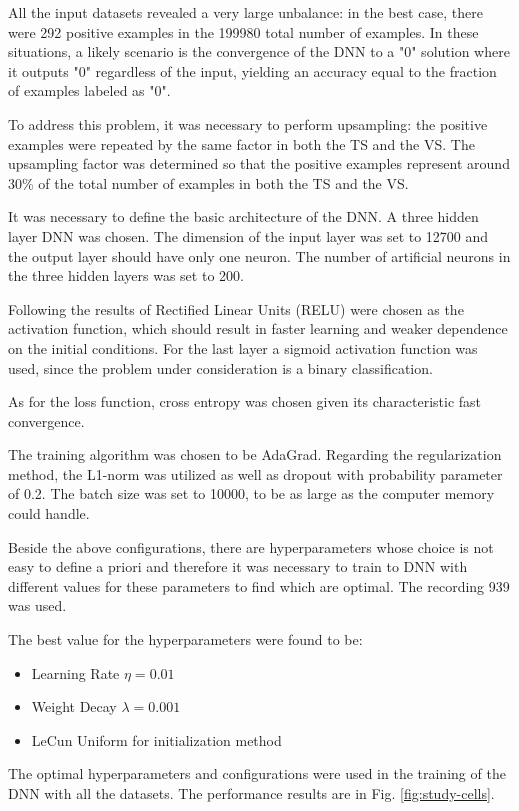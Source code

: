 \documentclass[10pt]{article}
\begin{document}
All the input datasets revealed a very large unbalance: in the best case, there were 292 positive examples in the 199980 total number of examples. In these situations, a likely scenario is the convergence of the DNN to a "0" solution where it outputs "0" regardless of the input, yielding an accuracy equal to the fraction of examples labeled as "0".

To address this problem, it was necessary to perform upsampling: the positive examples were repeated by the same factor in both the TS and the VS. The upsampling factor was determined so that the positive examples represent around 30\% of the total number of examples in both the TS and the VS.

It was necessary to define the basic architecture of the DNN. A three hidden layer DNN was chosen. The dimension of the input layer was set to 12700 and the output layer should have only one neuron. The number of artificial neurons in the three hidden layers was set to 200.

Following the results of \cite{glorot2011deep} Rectified Linear Units (RELU) were chosen as the activation function, which should result in faster learning and weaker dependence on the initial conditions. For the last layer a sigmoid activation function was used, since the problem under consideration is a binary classification.

As for the loss function, cross entropy was chosen given its characteristic fast convergence.

The training algorithm was chosen to be AdaGrad.
Regarding the regularization method, the L1-norm was utilized as well as dropout with probability parameter of 0.2.
The batch size was set to 10000, to be as large as the computer memory could handle.

Beside the above configurations, there are hyperparameters whose choice is not easy to define a priori and therefore it was necessary to train to DNN with different values for these parameters to find which are optimal. The recording 939 was used. 

The best value for the hyperparameters were found to be:
\begin{itemize}
\item Learning Rate $\eta = 0.01$
\item Weight Decay $\lambda = 0.001$
\item LeCun Uniform for initialization method
\end{itemize}

The optimal hyperparameters and configurations were used in the training of the DNN with all the datasets. The performance results are in Fig. \ref{fig:study-cells}.
\end{document}
